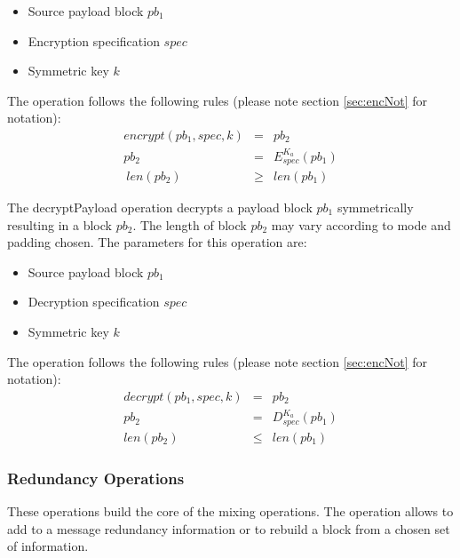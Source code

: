 \documentclass[10pt,journal,compsoc]{IEEEtran}
\begin{document}
\begin{itemize}
	\item Source payload block $pb_1$
	\item Encryption specification $spec$
	\item Symmetric key $k$
\end{itemize}

The operation follows the following rules (please note section \ref{sec:encNot} for notation):
\begin{eqnarray}
encrypt(pb_1, spec, k) & = & pb_2 \\
pb_2 & = & E_{spec}^{K_a}\left( pb_1 \right)\\\
len(pb_2) & \geq & len(pb_1)
\end{eqnarray}


The decryptPayload operation decrypts a payload block $pb_1$ symmetrically resulting in a block $pb_2$. The length of block $pb_2$ may vary according to mode and padding chosen. The parameters for this operation are:

\begin{itemize}
	\item Source payload block $pb_1$
	\item Decryption specification $spec$
	\item Symmetric key $k$
\end{itemize}

The operation follows the following rules (please note section \ref{sec:encNot} for notation):
\begin{eqnarray}
decrypt(pb_1, spec, k) & = & pb_2 \\
pb_2 & = & D_{spec}^{K_a}\left( pb_1 \right)\\
len(pb_2) & \leq & len(pb_1)
\end{eqnarray}

\subsubsection{Redundancy Operations}
These operations build the core of the mixing operations. The operation allows to add to a message redundancy information or to rebuild a block from a chosen set of information. 
\end{document}

